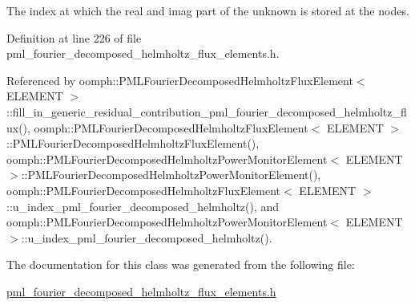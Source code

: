 The index at which the real and imag part of the unknown is stored at the nodes. 



Definition at line 226 of file pml\+\_\+fourier\+\_\+decomposed\+\_\+helmholtz\+\_\+flux\+\_\+elements.\+h.



Referenced by oomph\+::\+P\+M\+L\+Fourier\+Decomposed\+Helmholtz\+Flux\+Element$<$ E\+L\+E\+M\+E\+N\+T $>$\+::fill\+\_\+in\+\_\+generic\+\_\+residual\+\_\+contribution\+\_\+pml\+\_\+fourier\+\_\+decomposed\+\_\+helmholtz\+\_\+flux(), oomph\+::\+P\+M\+L\+Fourier\+Decomposed\+Helmholtz\+Flux\+Element$<$ E\+L\+E\+M\+E\+N\+T $>$\+::\+P\+M\+L\+Fourier\+Decomposed\+Helmholtz\+Flux\+Element(), oomph\+::\+P\+M\+L\+Fourier\+Decomposed\+Helmholtz\+Power\+Monitor\+Element$<$ E\+L\+E\+M\+E\+N\+T $>$\+::\+P\+M\+L\+Fourier\+Decomposed\+Helmholtz\+Power\+Monitor\+Element(), oomph\+::\+P\+M\+L\+Fourier\+Decomposed\+Helmholtz\+Flux\+Element$<$ E\+L\+E\+M\+E\+N\+T $>$\+::u\+\_\+index\+\_\+pml\+\_\+fourier\+\_\+decomposed\+\_\+helmholtz(), and oomph\+::\+P\+M\+L\+Fourier\+Decomposed\+Helmholtz\+Power\+Monitor\+Element$<$ E\+L\+E\+M\+E\+N\+T $>$\+::u\+\_\+index\+\_\+pml\+\_\+fourier\+\_\+decomposed\+\_\+helmholtz().



The documentation for this class was generated from the following file\+:\begin{DoxyCompactItemize}
\item 
\hyperlink{pml__fourier__decomposed__helmholtz__flux__elements_8h}{pml\+\_\+fourier\+\_\+decomposed\+\_\+helmholtz\+\_\+flux\+\_\+elements.\+h}\end{DoxyCompactItemize}
